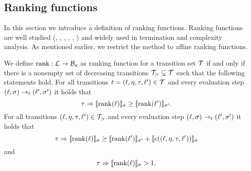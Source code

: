 \subsection{Ranking functions}

In this section we introduce a definition of ranking functions.
Ranking functions are well studied (\cite{bradley2005polyranking}, \cite{podelski2004prf}, \cite{bradley2005linear}, \cite{bagnara2012new}, \cite{leike2014ranking}, \cite{ben2013linear}) and widely used in termination and complexity analysis.
As mentioned earlier, we restrict the method to affine ranking functions.


\begin{definition} 
	We define $\text{rank}: \mathcal{L} \rightarrow \mathcal{B}_a$ as ranking function for a transition set $\mathcal{T}$ if and only if there is a nonempty set of decreasing transitions $\mathcal{T}_{>} \subseteq \mathcal{T}$ such that the following statements hold.
        For all transitions $t = (\ell, \eta, \tau, \ell') \in \mathcal{T}$ and every evaluation step $(\ell, \sigma) \rightarrow_t (\ell', \sigma')$ it holds that
	\[ \tau \Rightarrow \llbracket \text{rank}(\ell) \rrbracket_{\sigma} \geq \llbracket \text{rank}(\ell') \rrbracket_{\sigma'}. \]
        For all transitions $(\ell, \eta, \tau, \ell') \in \mathcal{T}_{>}$ and every evaluation step $(\ell, \sigma) \rightarrow_t (\ell', \sigma')$ it holds that        
	\[ \tau \Rightarrow \llbracket \text{rank}(\ell) \rrbracket_{\sigma} \geq \llbracket \text{rank}(\ell') \rrbracket_{\sigma'} + \llbracket c((\ell, \eta, \tau, \ell')) \rrbracket_{\sigma} \]
        and
	\[ \tau \Rightarrow \llbracket \text{rank}(\ell) \rrbracket_{\sigma} > 1. \]
\end{definition}





